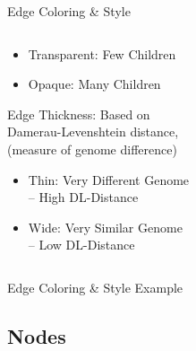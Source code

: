 \documentclass{beamer}
\begin{document}
\begin{frame}{Edge Coloring \& Style}
\begin{columns}
\begin{column}{.55\textwidth}
\begin{overprint}
\begin{itemize}
				\setlength\itemsep{1em}
					\item Transparent: Few Children
					\item Opaque: Many Children
				\end{itemize} 
				\hspace{.5cm} Edge Thickness: Based on \\ \vspace{.00cm}
                \hspace{0.75cm} Damerau-Levenshtein distance, \\ \vspace{.00cm}
                \hspace{0.75cm} (measure of genome difference) \vspace{.5em}
				\begin{itemize}
				\setlength\itemsep{1em}
					\item Thin: Very Different Genome \\ \hspace{.5cm} -- High DL-Distance 
					\item Wide: Very Similar Genome \\ \hspace{.5cm} -- Low DL-Distance
				\end{itemize}
		\end{overprint}
		\end{column}
		
		\begin{column}{.5\textwidth}
		\begin{overprint}
		\end{overprint}
		\end{column}
\end{columns}
\end{frame}


\begin{frame}{Edge Coloring \& Style Example}
\end{frame}


\subsection[Nodes]{Nodes}
\end{document}

